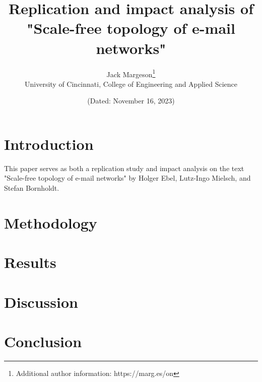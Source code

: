 \documentclass[a4paper]{article}
\title{Replication and impact analysis of\\"Scale-free topology of e-mail networks" }
\author{Jack Margeson\thanks{Additional author information: https://marg.es/on}\\
University of Cincinnati, College of Engineering and Applied Science}
\date{\normalsize{(Dated: November 16, 2023)}}
\begin{document}
\maketitle

\vspace{-3mm} %

\begin{abstract}
    \blindtext
\end{abstract}

\vspace{5mm} %

\begin{multicols}{2}

\section{Introduction}
This paper serves as both a replication study and impact analysis on the text "Scale-free topology of e-mail networks" by Holger Ebel, Lutz-Ingo Mielsch, and Stefan Bornholdt.


\section{Methodology}
\blindtext

\section{Results}
\blindtext

\section{Discussion}
\blindtext

\section{Conclusion}
\blindtext

\end{multicols}
\end{document}
